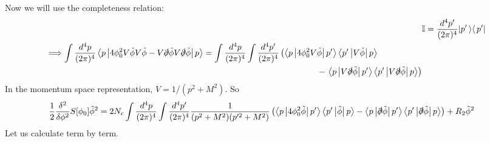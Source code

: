 \documentclass[tightenlines,floatfix,nofootinbib,superscriptaddress,fleqn]{revtex4-2}
\begin{document}
Now we will use the completeness relation:
\begin{align}\label{1-1-11}
  &\mathbb{I} = \frac{d^4p'}{(2\pi)^4}|p'\left>\right<p'|\\
  \begin{split}
    &\Longrightarrow
    \int\frac{d^4p}{(2\pi)^4}
     \left<p\left|4\phi_0^2V\tilde{\phi}V\tilde{\phi}
     -V\slashed{\partial}\tilde{\phi}
      V\slashed{\partial}\tilde{\phi}\right|p\right>
      =\int\frac{d^4p}{(2\pi)^4}\int\frac{d^4p'}{(2\pi)^4}
      \left(
                \left<p
                \left|4\phi_0^2V\tilde{\phi}
                \right|p'
                \right>
              \left<p'
              \left|V\tilde{\phi}
              \right|
              p\right>
      \right.\\
      &\qquad\qquad\qquad\qquad\qquad\qquad\qquad\qquad\qquad
      \qquad\qquad\qquad\qquad\qquad\qquad\qquad
      -\left.
                      \left<p
                      \left|V\slashed{\partial}\tilde{\phi}
                      \right|p'
                      \right>
              \left<p'
              \left|V\slashed{\partial}\tilde{\phi}
              \right|p
              \right>
        \right)
  \end{split}
\end{align}
In the momentum space representation, $V = 1/(p^2+M^2)$. So
\begin{align}\label{1-1-12}
  \begin{split}
    \frac{1}{2}\frac{\delta^2}{\delta\phi^2}S[\phi_0]\tilde{\phi}^2
    &=2N_c\int\frac{d^4p}{(2\pi)^4}\int\frac{d^4p'}{(2\pi)^4}
    \frac{1}{(p^2+M^2)(p'^2+M^2)}
    \left(\left<p\left|4\phi_0^2\tilde{\phi}\right|p'\right>
    \left<p'\left|\tilde{\phi}\right|p\right>
    -\left<p\left|\slashed{\partial}\tilde{\phi}\right|p'\right>
    \left<p'\left|\slashed{\partial}\tilde{\phi}\right|p\right>
    \right)+R_2\tilde{\phi}^2
  \end{split}
\end{align}
Let us calculate term by term.
\end{document}
